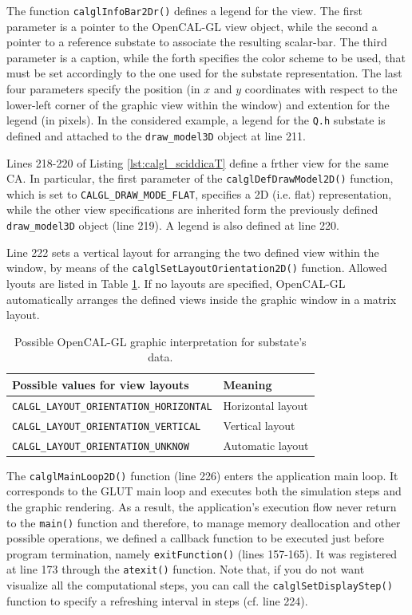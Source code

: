 The function \verb'calglInfoBar2Dr()' defines a legend for the
view. The first parameter is a pointer to the OpenCAL-GL view object,
while the second a pointer to a reference substate to associate the
resulting scalar-bar. The third parameter is a caption, while the
forth specifies the color scheme to be used, that must be set
accordingly to the one used for the substate representation. The last
four parameters specify the position (in $x$ and $y$ coordinates with
respect to the lower-left corner of the graphic view within the
window) and extention for the legend (in pixels). In the considered
example, a legend for the \verb'Q.h' substate is defined and attached
to the \verb'draw_model3D' object at line 211.

Lines 218-220 of Listing \ref{lst:calgl_sciddicaT} define a frther
view for the same CA. In particular, the first parameter of the
\verb'calglDefDrawModel2D()' function, which is set to
\verb'CALGL_DRAW_MODE_FLAT', specifies a 2D (i.e. flat)
representation, while the other view specifications are inherited form
the previously defined \verb'draw_model3D' object (line 219). A legend
is also defined at line 220.

Line 222 sets a vertical layout for arranging the two defined view
within the window, by means of the
\verb'calglSetLayoutOrientation2D()' function. Allowed lyouts are
listed in Table \ref{tab:calgl_layouts}. If no layouts are specified,
OpenCAL-GL automatically arranges the defined views inside the graphic
window in a matrix layout.

\begin{table}
  \centering
  \small
  \begin{tabular}{l|l}
    \hline
    Possible values for view layouts & Meaning\\
    \hline
    \hline
    \verb'CALGL_LAYOUT_ORIENTATION_HORIZONTAL' & Horizontal layout\\
    \verb'CALGL_LAYOUT_ORIENTATION_VERTICAL'   & Vertical layout\\
    \verb'CALGL_LAYOUT_ORIENTATION_UNKNOW'     & Automatic layout\\
    \hline
  \end{tabular}
  \caption{Possible OpenCAL-GL graphic interpretation for substate's data.}
  \label{tab:calgl_layouts}
\end{table} 

The \verb'calglMainLoop2D()' function (line 226) enters the
application main loop. It corresponds to the GLUT main loop and
executes both the simulation steps and the graphic rendering. As a
result, the application's execution flow never return to the
\verb'main()' function and therefore, to manage memory deallocation
and other possible operations, we defined a callback function to be
executed just before program termination, namely \verb'exitFunction()'
(lines 157-165). It was registered at line 173 through the
\verb'atexit()' function. Note that, if you do not want visualize all
the computational steps, you can call the \verb'calglSetDisplayStep()'
function to specify a refreshing interval in steps (cf. line 224).

